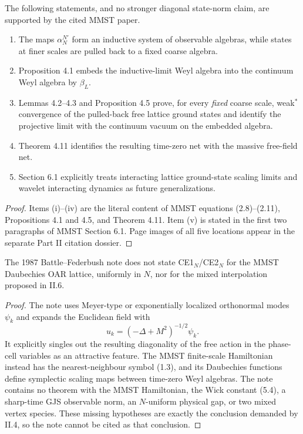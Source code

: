 \documentclass[11pt,a4paper]{article}
\begin{document}
\begin{proposition}\label{prop:mmst-scope}
The following statements, and no stronger diagonal state-norm claim, are supported by
the cited MMST paper.
\begin{enumerate}[label=\textup{(\roman*)}]
\item The maps $\alpha_N^{N'}$ form an inductive system of observable algebras, while
states at finer scales are pulled back to a fixed coarse algebra.
\item Proposition 4.1 embeds the inductive-limit Weyl algebra into the continuum Weyl
algebra by $\beta_L$.
\item Lemmas 4.2--4.3 and Proposition 4.5 prove, for every \emph{fixed} coarse scale,
weak$^*$ convergence of the pulled-back free lattice ground states and identify the
projective limit with the continuum vacuum on the embedded algebra.
\item Theorem 4.11 identifies the resulting time-zero net with the massive free-field
net.
\item Section 6.1 explicitly treats interacting lattice ground-state scaling limits and
wavelet interacting dynamics as future generalizations.
\end{enumerate}
\end{proposition}

\begin{proof}
Items (i)--(iv) are the literal content of MMST equations (2.8)--(2.11),
Propositions 4.1 and 4.5, and Theorem 4.11.  Item (v) is stated in the first two
paragraphs of MMST Section 6.1.  Page images of all five locations appear in the
separate Part II citation dossier.
\end{proof}

\begin{proposition}\label{prop:battle-scope}
The 1987 Battle--Federbush note does not state CE1$_N$/CE2$_N$ for the MMST
Daubechies OAR lattice, uniformly in $N$, nor for the mixed interpolation proposed in
II.6.
\end{proposition}

\begin{proof}
The note uses Meyer-type or exponentially localized orthonormal modes $\psi_k$ and
expands the Euclidean field with
\[
 u_k=(-\Delta+M^2)^{-1/2}\psi_k.                                \tag{6.1}
\]
It explicitly singles out the resulting diagonality of the free action in the phase-cell
variables as an attractive feature.  The MMST finite-scale Hamiltonian instead has the
nearest-neighbour symbol (1.3), and its Daubechies functions define symplectic scaling
maps between time-zero Weyl algebras.  The note contains no theorem with the MMST
Hamiltonian, the Wick constant (5.4), a sharp-time GJS observable norm, an $N$-uniform
physical gap, or two mixed vertex species.  These missing hypotheses are exactly the
conclusion demanded by II.4, so the note cannot be cited as that conclusion.

\end{proof}
\end{document}
